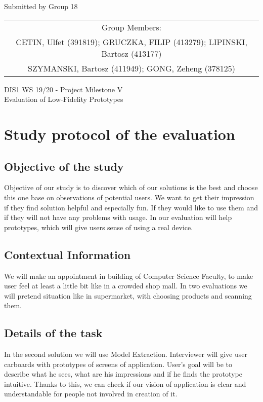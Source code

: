 \documentclass[a4paper,10pt,oneside]{scrreprt}
\begin{document}
\begin{center}
	Submitted by Group 18

	\bigskip

	\begin{tabular}{c}
	Group Members: \\
	CETIN, Ulfet (391819); GRUCZKA, FILIP (413279);	LIPINSKI, Bartosz (413177) \\
	SZYMANSKI, Bartosz (411949); GONG, Zeheng (378125)\\
	\end{tabular}

	\bigskip

	DIS1 WS 19/20 - Project Milestone V\\
	Evaluation of Low-Fidelity Prototypes\\

\end{center}
\vspace{-1cm}

\clearpage

\begingroup
\let\clearpage\relax
	\chapter{Study protocol of the evaluation}
\endgroup


\section{Objective of the study}
Objective of our study is to discover which of our solutions is the best and choose this one base on observations of potential users. We want to get their impression if they find solution helpful and especially fun. If they would like to use them and if they will not have any problems with usage. In our evaluation will help prototypes, which will give users sense of using a real device.



\section{Contextual Information}
We will make an appointment in building of Computer Science Faculty, to make user feel at least a little bit like in a crowded shop mall. In two evaluations we will pretend situation like in supermarket, with choosing products and scanning them. 


\section{Details of the task}
In the second solution we will use Model Extraction. Interviewer will give user carboards with prototypes of screens of application. User's goal will be to describe what he sees, what are his impressions and if he finds the prototype intuitive. Thanks to this, we can check if our vision of application is clear and understandable for people not involved in creation of it.
\end{document}
